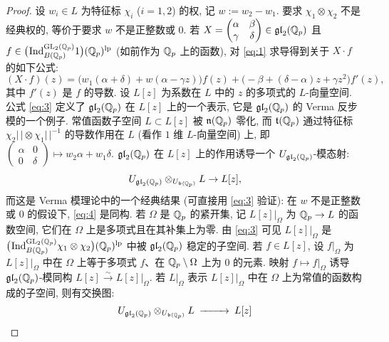 \begin{proof}
设 $w_i \in L$ 为特征标 $\chi_i$ ($i = 1,2$) 的权, 记 $w := w_2 - w_1$.
要求 $\chi_1 \otimes \chi_2$ 不是经典权的, 等价于要求 $w$ 不是正整数或 $0$.
若 $X = \begin{pmatrix} \alpha & \beta \\ \gamma & \delta \end{pmatrix} \in \mathfrak{gl}_2(\mathbb{Q}_p)$ 且 $f \in \bigl(\prescript{}{}{\mathrm{Ind}}_{B(\mathbb{Q}_p)}^{\mathrm{GL}_2(\mathbb{Q}_p)} 1\bigr)(\mathbb{Q}_p)^{\mathrm{lp}}$ (如前作为 $\mathbb{Q}_p$ 上的函数), 对 \eqref{eq:1} 求导得到关于 $X \cdot f$ 的如下公式:
\begin{equation}
\label{eq:3}
(X \cdot f)(z) = \bigl(w_1(\alpha+\delta) + w(\alpha-\gamma z)\bigr)f(z) + \bigl(-\beta + (\delta-\alpha)z + \gamma z^{2}\bigr)f'(z),
\end{equation}
其中 $f'(z)$ 是 $f$ 的导数.
设 $L[z]$ 为系数在 $L$ 中的 $z$ 的多项式的 $L$-向量空间.
公式 \eqref{eq:3} 定义了 $\mathfrak{gl}_2(\mathbb{Q}_p)$ 在 $L[z]$ 上的一个表示, 它是 $\mathfrak{gl}_2(\mathbb{Q}_p)$ 的 Verma 反步模的一个例子.
常值函数子空间 $L \subset L[z]$ 被 $\mathfrak{n}(\mathbb{Q}_p)$ 零化, 而 $\mathfrak{t}(\mathbb{Q}_p)$ 通过特征标 $\chi_2|\,| \otimes \chi_1|\,|^{-1}$ 的导数作用在 $L$ (看作 $1$ 维 $L$-向量空间) 上, 即 $\begin{pmatrix} \alpha & 0 \\ 0 & \delta \end{pmatrix} \mapsto w_2\alpha + w_1\delta$.
$\mathfrak{gl}_2(\mathbb{Q}_p)$ 在 $L[z]$ 上的作用诱导一个 $U_{\mathfrak{gl}_2(\mathbb{Q}_p)}$-模态射:
\begin{equation}
\label{eq:4}
U_{\mathfrak{gl}_2(\mathbb{Q}_p)} \otimes_{U_{\mathfrak{b}(\mathbb{Q}_p)}} L \to L[z],
\end{equation}
而这是 Verma 模理论中的一个经典结果 (可直接用 \eqref{eq:3} 验证): 在 $w$ 不是正整数或 $0$ 的假设下, \eqref{eq:4} 是同构.
若 $\Omega$ 是 $\mathbb{Q}_p$ 的紧开集, 记 $L[z]|_{\Omega}$ 为 $\mathbb{Q}_p \to L$ 的函数空间, 它们在 $\Omega$ 上是多项式且在其补集上为零.
由 \eqref{eq:3} 可见 $L[z]|_{\Omega}$ 是 $\bigl(\prescript{}{}{\mathrm{Ind}}_{B(\mathbb{Q}_p)}^{\mathrm{GL}_2(\mathbb{Q}_p)} \chi_1 \otimes \chi_2\bigr)(\mathbb{Q}_p)^{\mathrm{lp}}$ 中被 $\mathfrak{gl}_2(\mathbb{Q}_p)$ 稳定的子空间.
若 $f \in L[z]$, 设 $f|_{\Omega}$ 为 $L[z]|_{\Omega}$ 中在 $\Omega$ 上等于多项式 $f$、在 $\mathbb{Q}_p \setminus \Omega$ 上为 $0$ 的元素.
映射 $f \mapsto f|_{\Omega}$ 诱导 $\mathfrak{gl}_2(\mathbb{Q}_p)$-模同构 $L[z] \xrightarrow{\sim} L[z]|_{\Omega}$.
若 $L|_{\Omega}$ 表示 $L[z]|_{\Omega}$ 中在 $\Omega$ 上为常值的函数构成的子空间, 则有交换图:
\[
\begin{CD}
U_{\mathfrak{gl}_2(\Qp)} \otimes_{U_{\mathfrak{b}(\Qp)}} L @>>> L[z]\\

\end{CD}\]
\end{proof}
